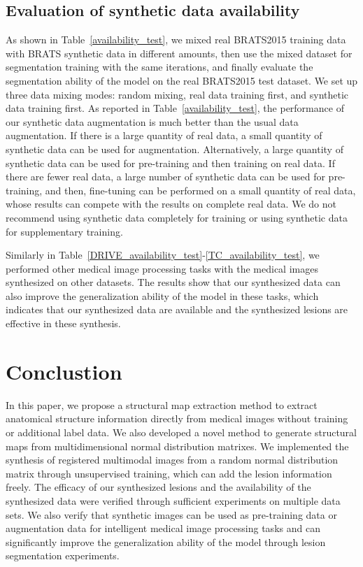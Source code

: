 \documentclass[runningheads]{llncs}
\begin{document}
	\subsection{Evaluation of synthetic data availability}
	As shown in Table~\ref{availability_test}, we mixed real BRATS2015 training data with BRATS synthetic data in different amounts, then use the mixed dataset for segmentation training with the same iterations, and finally evaluate the segmentation ability of the model on the real BRATS2015 test dataset. We set up three data mixing modes: random mixing, real data training first, and synthetic data training first. As reported in Table~\ref{availability_test}, the performance of our synthetic data augmentation is much better than the usual data augmentation. If there is a large quantity of real data, a small quantity of synthetic data can be used for augmentation. Alternatively, a large quantity of synthetic data can be used for pre-training and then training on real data. If there are fewer real data, a large number of synthetic data can be used for pre-training, and then, fine-tuning can be performed on a small quantity of real data, whose results can compete with the results on complete real data.  We do not recommend using synthetic data completely for training or using synthetic data for supplementary training.
	
	Similarly in Table~\ref{DRIVE_availability_test}-\ref{TC_availability_test}, we performed other medical image processing tasks with the medical images synthesized on other datasets. The results show that our synthesized data can also improve the generalization ability of the model in these tasks, which indicates that our synthesized data are available and the synthesized lesions are effective in these synthesis.
	\section{Conclustion}
	In this paper, we propose a structural map extraction method to extract anatomical structure information directly from medical images without training or additional label data.
	We also developed a novel method to generate structural maps from multidimensional normal distribution matrixes.
	We implemented the synthesis of registered multimodal images from a random normal distribution matrix through unsupervised training, which can add the lesion information freely.
	The efficacy of our synthesized lesions and the availability of the synthesized data were verified through sufficient experiments on multiple data sets. We also verify that synthetic images can be used as pre-training data or augmentation data for intelligent medical image processing tasks and can significantly improve the generalization ability of the model through lesion segmentation experiments.
	
	
		
\end{document}
